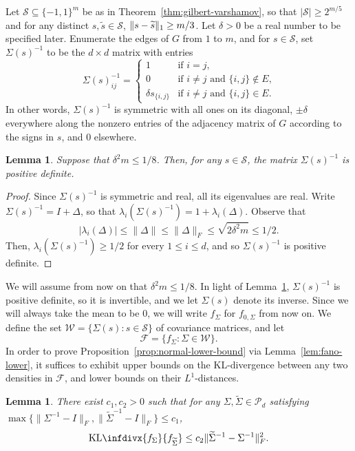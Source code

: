\documentclass[letterpaper]{amsart}
\newcommand{\infdiv}{\mathrm{KL}\infdivx}
\DeclarePairedDelimiter{\norm}{\lVert}{\rVert}
\newcommand{\sP}{\mathcal{P}}
\newcommand{\sW}{\mathcal{W}}
\newcommand{\sS}{\mathcal{S}}
\newcommand{\sF}{\mathcal{F}}
\let\originalleft\left
\let\originalright\right
\def\left#1{\mathopen{}\originalleft#1}
\def\right#1{\originalright#1\mathclose{}}
\newcommand{\thmref}[1]{Theorem~\ref{thm:#1}}
\numberwithin{thm}{section}
\newtheorem{lem}[thm]{Lemma}{\bfseries}{\itshape}
\newcommand{\lemlabel}[1]{\label{lem:#1}}
\newcommand{\lemref}[1]{Lemma~\ref{lem:#1}}
\newcommand{\propref}[1]{Proposition~\ref{prop:#1}}
\theoremstyle{definition}
\theoremstyle{plain}
\renewcommand{\tilde}[1]{\widetilde{#1}}
\begin{document}
Let $\sS \subseteq \{-1, 1\}^{m}$ be as in \thmref{gilbert-varshamov},
so that $|\sS| \ge 2^{m/5}$ and for any distinct
$s, \tilde{s} \in \sS$, $\norm{s - \tilde{s}}_1 \ge m/3$.  Let
$\delta > 0$ be a real number to be specified later. Enumerate the
edges of $G$ from $1$ to $m$, and for $s \in \sS$, set
$\Sigma(s)^{-1}$ to be the $d \times d$ matrix with entries
\[
  \Sigma(s)^{-1}_{i j} = \left\{\begin{array}{ll}
                                  1 & \mbox{if $i = j$,} \\
                                  0 & \mbox{if $i \neq j$ and $\{i, j\} \not\in E$,} \\
                                  \delta s_{\{i, j\}} & \mbox{if $i \neq j$ and $\{i, j\} \in E$.}
                                 \end{array} \right.
\]
In other words, $\Sigma(s)^{-1}$ is symmetric with all ones on its
diagonal, $\pm \delta$ everywhere along the nonzero entries of the
adjacency matrix of $G$ according to the signs in $s$, and $0$
elsewhere.
\begin{lem}\lemlabel{psd}
  Suppose that $\delta^2 m \le 1/8$. Then, for any $s \in \sS$, the
  matrix $\Sigma(s)^{-1}$ is positive definite.
\end{lem}
\begin{proof}
  Since $\Sigma(s)^{-1}$ is symmetric and real, all its eigenvalues
  are real. Write $\Sigma(s)^{-1} = I + \Delta$, so that
  $\lambda_i(\Sigma(s)^{-1}) = 1 + \lambda_i(\Delta)$. Observe that
  \[
    |\lambda_i(\Delta)| \le \|\Delta\| \le \|\Delta\|_F \le \sqrt{2 \delta^2 m} \le 1/2 .
  \]
  Then,
  $\lambda_i(\Sigma(s)^{-1}) \ge 1/2$ for every $1 \le i \le d$, and so
  $\Sigma(s)^{-1}$ is positive definite.
\end{proof}
We will assume from now on that $\delta^2 m \le 1/8$.  In light of
\lemref{psd}, $\Sigma(s)^{-1}$ is positive definite, so it is
invertible, and we let $\Sigma(s)$ denote its inverse.  Since we will
always take the mean to be $0$, we will write $f_{\Sigma}$ for
$f_{0, \Sigma}$ from now on.  We define the set
$\sW = \{\Sigma(s) \colon s \in \sS\}$ of covariance matrices, and let
\[
  \sF = \{f_{\Sigma} \colon \Sigma \in \sW\} .
\]
In order to prove \propref{normal-lower-bound} via
\lemref{fano-lower}, it suffices to exhibit upper bounds on the
KL-divergence between any two densities in $\sF$, and lower bounds on
their $L^1$-distances.
\begin{lem}\lemlabel{normal-kl}
  There exist $c_1, c_2 > 0$ such that for any
  $\Sigma, \tilde{\Sigma} \in \sP_d$ satisfying
  $\max\{\|\Sigma^{-1} - I\|_F, \|\tilde{\Sigma}^{-1} - I\|_F\} \le
  c_1$,
  \[
    \infdiv{f_{\Sigma}}{f_{\tilde{\Sigma}}} \le c_2
    \|\tilde{\Sigma}^{-1} - \Sigma^{-1}\|_F^2.
  \]
\end{lem}
\end{document}
